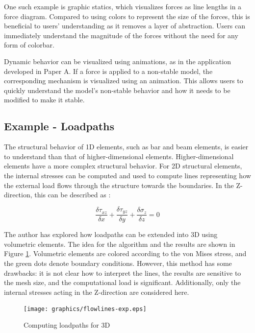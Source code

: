 One such example is graphic statics, which visualizes forces as line lengths in a force diagram. Compared to using colors to represent the size of the forces, this is beneficial to users’ understanding as it removes a layer of abstraction. Users can immediately understand the magnitude of the forces without the need for any form of colorbar.

Dynamic behavior can be visualized using animations, as in the application developed in Paper A. If a force is applied to a non-stable model, the corresponding mechanism is visualized using an animation. This allows users to quickly understand the model’s non-stable behavior and how it needs to be modified to make it stable. 

\subsection{Example - Loadpaths}
The structural behavior of 1D elements, such as bar and beam elements, is easier to understand than that of higher-dimensional elements. Higher-dimensional elements have a more complex structural behavior. For 2D structural elements, the internal stresses can be computed and used to compute lines representing how the external load flows through the structure towards the boundaries. In the Z-direction, this can be described as \cite{Fonseca1997}:

\begin{equation*}
\frac{\delta \tau_{xz}}{\delta x} + \frac{\delta \tau_{yz}}{\delta y} + \frac{\delta \sigma_{z}}{\delta z}= 0
\end{equation*}

The author  has explored how loadpaths can be extended into 3D using volumetric elements. The idea for the algorithm and the results are shown in Figure \ref{fig:flowlines-exp}. Volumetric elements are colored according to the von Mises stress, and the green dots denote boundary conditions. However, this method has some drawbacks: it is not clear how to interpret the lines, the results are sensitive to the mesh size, and the computational load is significant. Additionally, only the internal stresses acting in the Z-direction are considered here.
 
\begin{figure}
  \texttt{[image: graphics/flowlines-exp.eps]}
  \caption{Computing loadpaths for 3D}
  \label{fig:flowlines-exp}
\end{figure}
